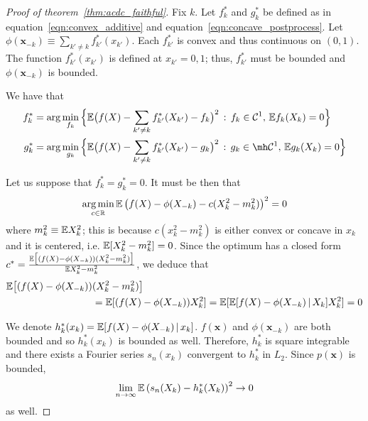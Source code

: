 \begin{proof}[Proof of theorem~\ref{thm:acdc_faithful}]

Fix $k$. Let $f^*_k$ and $g^*_k$ be defined as in
equation~\ref{eqn:convex_additive} and
equation~\ref{eqn:concave_postprocess}. Let $\phi(\mathbf{x}_{-k})
\equiv \sum_{k' \neq k} f^*_{k'}(x_{k'})$. Each $f^*_{k'}$ is convex
and thus continuous on $(0,1)$. The function $f^*_{k'}(x_{k'})$ is defined at
$x_{k'} = 0,1$; thus, $f^*_{k'}$ must be bounded and
$\phi(\mathbf{x}_{-k})$ is bounded.

We have that
\begin{align}
f^*_k &= \arg\min_{f_k} \Big\{
   \E\big( f(X) - \sum_{k' \neq k} f^*_{k'}(X_{k'}) - f_k \big)^2 
    \,:\, f_k \in  \mathcal{C}^1,\, \E f_k(X_k) = 0 
  \Big\} \\
g^*_k &= \arg\min_{g_k} \Big\{
   \E\big( f(X) - \sum_{k' \neq k} f^*_{k'}(X_{k'}) - g_k \big)^2 
    \,:\, g_k \in \mh \mathcal{C}^1,\, \E g_k(X_k) = 0 
  \Big\}
\end{align}

Let us suppose that $f^*_k = g^*_k = 0$. It must be then that
\begin{align*}
\mathop{\text{\rm arg\,min}}_{c \in {\mathbb R}} {\mathbb E} \left( f(X) - \phi(X_{-k}) - c (X_k^2 - m_k^2) \right)^2 = 0
\end{align*}
where $m_k^2 \equiv {\mathbb E} X_k^2$; this is because $c(x_k^2 - m_k^2)$ is either convex or concave in $x_k$ and it is centered, i.e. ${\mathbb E}[ X_k^2 - m_k^2] = 0$. Since the optimum has a closed form $c^* = \frac{{\mathbb E}\big[(f(X) -\phi(X_{-k}))(X_k^2 - m^2_k)\big]}{{\mathbb E} X_k^2 - m^2_k}$, we deduce that 
\begin{align*}
{\mathbb E} \big[ (f(X) - \phi(X_{-k})) &(X_k^2 - m_k^2) \big] \\
   &= {\mathbb E}[ (f(X) - \phi(X_{-k})) X^2_k] = 
 {\mathbb E}[ {\mathbb E}[ f(X) - \phi(X_{-k}) {\,|\,} X_k] X^2_k] = 0
\end{align*}

We denote $h^*_k(x_k) = {\mathbb E}[ f(X) - \phi(X_{-k}) {\,|\,} x_k]$. $f(\mathbf{x})$ and $\phi(\mathbf{x}_{-k})$ are both bounded and so $h^*_k(x_k)$ is bounded as well. Therefore, $h^*_k$ is square integrable and there exists a Fourier series $s_n(x_k)$ convergent to $h^*_k$ in $L_2$. Since $p(\mathbf{x})$ is bounded, $$\lim_{n \rightarrow \infty} {\mathbb E} \left( s_n(X_k) - h^*_k(X_k ) \right)^2 \rightarrow 0$$ as well.



\end{proof}
